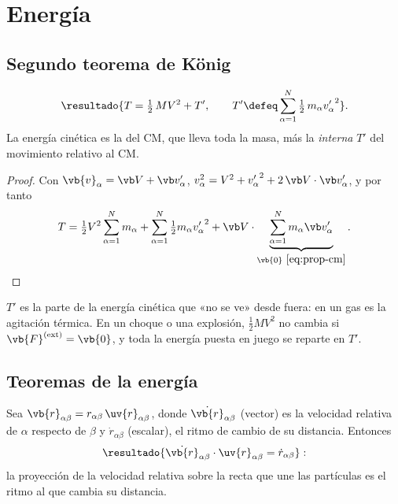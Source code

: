 \section{Energía}
\label{sec:energia}

\subsection{Segundo teorema de König}

\begin{teorema}
\label{teo:konig2}
\begin{equation}
  \resultado{T=\tfrac12\,MV^{2}+T',\qquad T'\defeq\sa\tfrac12\,m_{\alpha}{v'_{\alpha}}^{2}} .
  \label{eq:konig2}
\end{equation}
La energía cinética es la del CM, que lleva toda la masa, más la
\emph{interna} $T'$ del movimiento relativo al CM.
\end{teorema}

\begin{proof}
Con $\vb{v}_{\alpha}=\Vc+\vp_{\alpha}$, $v_{\alpha}^{2}=V^{2}+{v'_{\alpha}}^{2}+2\,\Vc\cdot\vp_{\alpha}$, y por tanto
\[
  T=\tfrac12V^{2}\sa m_{\alpha}+\sa\tfrac12 m_{\alpha}{v'_{\alpha}}^{2}
  +\Vc\cdot\underbrace{\sa m_{\alpha}\vp_{\alpha}}_{\vb{0}\ \eqref{eq:prop-cm}} .\qedhere
\]
\end{proof}

\begin{observacion}
$T'$ es la parte de la energía cinética que «no se ve» desde fuera: en un
gas es la agitación térmica. En un choque o una explosión, $\tfrac12MV^{2}$ no
cambia si $\vb{F}\ext=\vb{0}$, y toda la energía puesta en juego se reparte en $T'$.
\end{observacion}

\subsection{Teoremas de la energía}

\begin{lema}
\label{lem:radial}
Sea $\vb{r}_{\alpha\beta}=r_{\alpha\beta}\,\uv{r}_{\alpha\beta}$, donde $\dot{\vb{r}}_{\alpha\beta}$ (vector) es la velocidad relativa
de $\alpha$ respecto de $\beta$ y $\dot r_{\alpha\beta}$ (escalar), el ritmo de cambio de su distancia. Entonces
\begin{equation}
  \resultado{\dot{\vb{r}}_{\alpha\beta}\cdot\uv{r}_{\alpha\beta}=\dot r_{\alpha\beta}} :
\end{equation}
la proyección de la velocidad relativa sobre la recta que une las partículas
es el ritmo al que cambia su distancia.
\end{lema}

